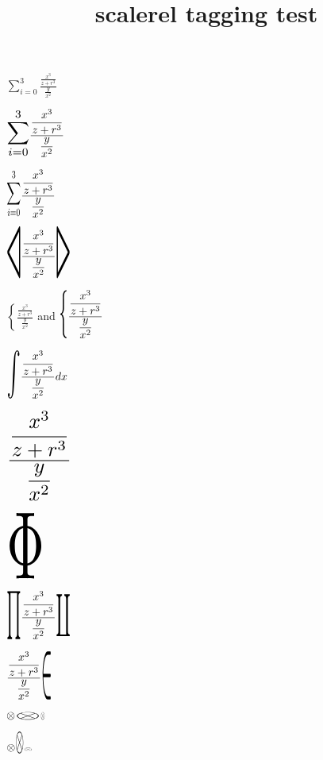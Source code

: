 \documentclass{article}
\title{scalerel tagging test}
\def\preblob{\displaystyle\sum_{i=0}^3}
\def\blob{\displaystyle\frac{\displaystyle\frac{x^3}{z+r^3}}%
{\displaystyle\frac{y}{x^2}}%
}
\begin{document}
$\preblob\blob$

$\scalerel{\preblob}{\blob}$

$\scalerel[3ex]{\preblob}{\blob}$

$\scalerel[3ex]{\triangleleft}{\blob}
\scalerel*[3ex]{\triangleright}{\blob}$

$\left\{\blob\right.$ and $\stretchrel[550]{\{}{\blob}$

$\stretchrel[350]{\int}{\blob} dx$

$\scaleto{\blob}{80pt}$

$\stretchto[175]{\Phi}{60pt}$

$\scaleleftright[3ex]{\prod}{\blob}{\coprod}$

$\stretchleftright[450]{.}{\blob}{\in}$

$\otimes\hstretch{3}{\otimes}\hstretch{0.5}{\otimes}$

$\otimes\vstretch{3}{\otimes}\vstretch{0.5}{\otimes}$
\end{document}
